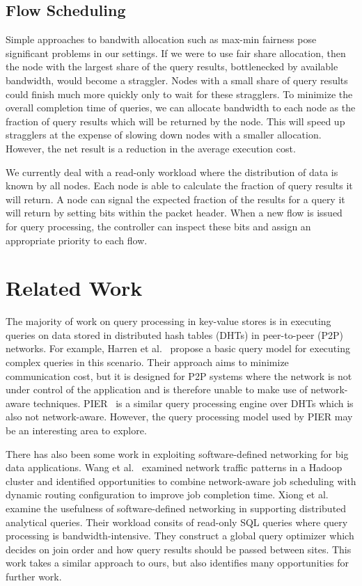 \documentclass{sig-alternate-2013}
\begin{document}
\subsection{Flow Scheduling}

Simple approaches to bandwith allocation such as max-min fairness pose significant problems in our settings.
If we were to use fair share allocation, then the node with the largest share of the query results, bottlenecked by available bandwidth, would become a straggler.
Nodes with a small share of query results could finish much more quickly only to wait for these stragglers.
To minimize the overall completion time of queries, we can allocate bandwidth to each node as the fraction of query results which will be returned by the node.
This will speed up stragglers at the expense of slowing down nodes with a smaller allocation.
However, the net result is a reduction in the average execution cost.

We currently deal with a read-only workload where the distribution of data is known by all nodes.
Each node is able to calculate the fraction of query results it will return.
A node can signal the expected fraction of the results for a query it will return by setting bits within the packet header.
When a new flow is issued for query processing, the controller can inspect these bits and assign an appropriate priority to each flow.

\section{Related Work}

The majority of work on query processing in key-value stores is in executing queries on data stored in distributed hash tables (DHTs) in peer-to-peer (P2P) networks.
For example, Harren et al.~\cite{Harren2002} propose a basic query model for executing complex queries in this scenario.
Their approach aims to minimize communication cost, but it is designed for P2P systems where the network is not under control of the application and is therefore unable to make use of network-aware techniques.
PIER~\cite{Huebsch2005} is a similar query processing engine over DHTs which is also not network-aware.
However, the query processing model used by PIER may be an interesting area to explore.

There has also been some work in exploiting software-defined networking for big data applications.
Wang et al.~\cite{Wang2012} examined network traffic patterns in a Hadoop cluster and identified opportunities to combine network-aware job scheduling with dynamic routing configuration to improve job completion time.
Xiong et al.~\cite{Xiong2014} examine the usefulness of software-defined networking in supporting distributed analytical queries.
Their workload consits of read-only SQL queries where query processing is bandwidth-intensive.
They construct a global query optimizer which decides on join order and how query results should be passed between sites.
This work takes a similar approach to ours, but also identifies many opportunities for further work.
\end{document}
